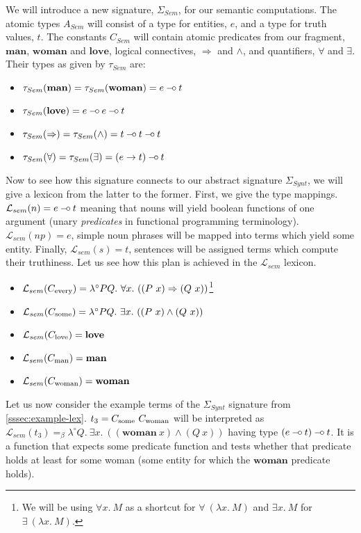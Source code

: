 We will introduce a new signature, $\Sigma_{Sem}$, for our semantic
computations. The atomic types $A_{Sem}$ will consist of a type for
entities, $e$, and a type for truth values, $t$. The constants $C_{Sem}$
will contain atomic predicates from our fragment, $\textbf{man}$,
$\textbf{woman}$ and $\textbf{love}$, logical connectives, $\Rightarrow$
and $\land$, and quantifiers, $\forall$ and $\exists$. Their types as
given by $\tau_{Sem}$ are:
\begin{itemize}
\item $\tau_{Sem}(\textbf{man}) = \tau_{Sem}(\textbf{woman}) = e \mathbin{{-}\mkern-3.5mu{\circ}}
  t$
\item $\tau_{Sem}(\textbf{love}) = e \mathbin{{-}\mkern-3.5mu{\circ}} e \mathbin{{-}\mkern-3.5mu{\circ}} t$
\item $\tau_{Sem}(\Rightarrow) = \tau_{Sem}(\land) = t \mathbin{{-}\mkern-3.5mu{\circ}} t \mathbin{{-}\mkern-3.5mu{\circ}} t$
\item $\tau_{Sem}(\forall) = \tau_{Sem}(\exists) = (e \to t) \mathbin{{-}\mkern-3.5mu{\circ}} t$
\end{itemize}

Now to see how this signature connects to our abstract signature
$\Sigma_{Synt}$, we will give a lexicon from the latter to the
former. First, we give the type mappings. $\mathcal{L}_{sem}(n) = e
\mathbin{{-}\mkern-3.5mu{\circ}} t$ meaning that nouns will yield boolean functions of one argument
(unary \emph{predicates} in functional programming
terminology). $\mathcal{L}_{sem}(np) = e$, simple noun phrases will be
mapped into terms which yield some entity. Finally,
$\mathcal{L}_{sem}(s) = t$, sentences will be assigned terms which
compute their truthiness. Let us see how this plan is achieved in the
$\mathcal{L}_{sem}$ lexicon.
\begin{itemize}
\item $\mathcal{L}_{sem}(C_{\textrm{every}}) = \lambda^{\circ} P Q.\ \forall
  x.\ ((P\ x) \Rightarrow (Q\ x))$\footnote{We will be using $\forall
    x.\ M$ as a shortcut for $\forall\ (\lambda x.\ M)$ and $\exists
    x.\ M$ for $\exists\ (\lambda x.\ M)$.}
\item $\mathcal{L}_{sem}(C_{\textrm{some}}) = \lambda^{\circ} P Q.\ \exists
  x.\ ((P\ x) \land (Q\ x))$
\item $\mathcal{L}_{sem}(C_{\textrm{love}}) = \textbf{love}$
\item $\mathcal{L}_{sem}(C_{\textrm{man}}) = \textbf{man}$
\item $\mathcal{L}_{sem}(C_{\textrm{woman}}) = \textbf{woman}$
\end{itemize}

Let us now consider the example terms of the $\Sigma_{Synt}$ signature
from \ref{sssec:example-lex}. $t_3 = C_{\textrm{some}}\ C_{\textrm{woman}}$ will be
interpreted as $\mathcal{L}_{sem}(t_3) =_{\beta} \lambda^{\circ}
Q.\ \exists x.\ ((\textbf{woman}\ x) \land (Q\ x))$ having type $(e \mathbin{{-}\mkern-3.5mu{\circ}}
t) \mathbin{{-}\mkern-3.5mu{\circ}} t$. It is a function that expects some predicate function and
tests whether that predicate holds at least for some woman (some entity
for which the $\textbf{woman}$ predicate holds).

